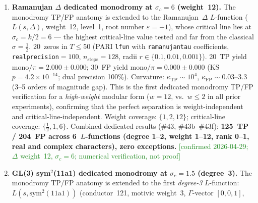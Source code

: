 \documentclass[11pt, a4paper]{article}
\theoremstyle{definition}
\theoremstyle{plain}
\begin{document}
\begin{enumerate}
        This is the first monodromy verification for a non-self-dual
        $L$-function, confirming that the $\arg(\Lambda)$-accumulation
        monodromy is well-defined and yields perfect TP/FP separation
        even when $\Lambda$ is complex-valued.
        Combined dedicated results (\#43, \#43b, \#43c, \#43d, \#43e):
        \textbf{105~TP / 174~FP across 5~$L$-functions
        (degree 1--2, rank 0--1, real and complex characters), zero exceptions.}
        \textcolor{ForestGreen}{[confirmed 2026-04-29; $\chi_{5,\mathrm{odd}}$ complex char.; numerical verification, not proof]}
  \item \textbf{Ramanujan $\Delta$ dedicated monodromy at $\sigma_c = 6$ (weight~12).}
        The monodromy TP/FP anatomy is extended to the Ramanujan~$\Delta$
        $L$-function ($L(s,\Delta)$, weight~12, level~1, root number
        $\varepsilon = +1$), whose critical line lies at $\sigma_c = k/2 = 6$
        --- the highest critical-line value tested and far from the
        classical $\sigma = \tfrac{1}{2}$.
        20~zeros in $T \leq 50$ (PARI \texttt{lfun} with
        \texttt{ramanujantau} coefficients, \texttt{realprecision}$=100$,
        $n_{\mathrm{steps}} = 128$, radii $r \in \{0.1, 0.01, 0.001\}$).
        20~TP yield mono$/\pi = 2.000 \pm 0.000$;
        30~FP yield mono$/\pi = 0.000 \pm 0.000$
        (KS $p = 4.2 \times 10^{-14}$; dual precision 100\%).
        Curvature: $\kappa_{\mathrm{TP}} \sim 10^{4}$,
        $\kappa_{\mathrm{FP}} \sim 0.03$--$3.3$ (3--5 orders of magnitude gap).
        This is the first dedicated monodromy TP/FP verification for a
        \emph{high-weight} modular form ($w = 12$, vs.\ $w \leq 2$
        in all prior experiments), confirming that the perfect separation
        is weight-independent and critical-line-independent.
        Weight coverage: $\{1, 2, 12\}$; critical-line coverage:
        $\{\tfrac{1}{2}, 1, 6\}$.
        Combined dedicated results (\#43, \#43b--\#43f):
        \textbf{125~TP / 204~FP across 6~$L$-functions
        (degree 1--2, weight 1--12, rank 0--1, real and complex characters),
        zero exceptions.}
        \textcolor{ForestGreen}{[confirmed 2026-04-29; $\Delta$ weight~12, $\sigma_c{=}6$; numerical verification, not proof]}
  \item \textbf{GL(3) sym$^2$(11a1) dedicated monodromy at $\sigma_c = 1.5$ (degree~3).}
        The monodromy TP/FP anatomy is extended to the first
        \emph{degree-3} $L$-function: $L(s, \mathrm{sym}^2(11\mathrm{a}1))$
        (conductor~121, motivic weight~3, $\Gamma$-vector $[0,0,1]$,

\end{enumerate}
\end{document}
